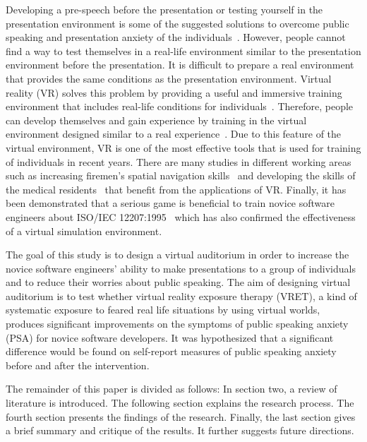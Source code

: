 \documentclass{llncs}
\begin{document}
Developing a pre-speech before the presentation or testing yourself in the presentation environment is some of the suggested solutions to overcome public speaking and presentation anxiety of the individuals~\cite{huff2008public}. However, people cannot find a way to test themselves in a real-life environment similar to the presentation environment before the presentation. It is difficult to prepare a real environment that provides the same conditions as the presentation environment. Virtual reality (VR) solves this problem by providing a useful and immersive training environment that includes real-life conditions for individuals~\cite{sampaio2014application}. Therefore, people can develop themselves and gain experience by training in the virtual environment designed similar to a real experience~\cite{jang2017direct}. Due to this feature of the virtual environment, VR is one of the most effective tools that is used for training of individuals in recent years. There are many studies in different working areas such as increasing firemen's spatial navigation skills~\cite{bliss1997effectiveness} and developing the skills of the medical residents~\cite{seymour2002virtual,grantcharov2004randomized} that benefit from the applications of VR. Finally, it has been demonstrated that a serious game is beneficial to train novice software engineers about ISO/IEC 12207:1995~\cite{aydan2016teaching} which has also confirmed the effectiveness of a virtual simulation environment.

The goal of this study is to design a virtual auditorium in order to increase the novice software engineers' ability to make presentations to a group of individuals and to reduce their worries about public speaking. The aim of designing virtual auditorium is to test whether virtual reality exposure therapy (VRET), a kind of systematic exposure to feared real life situations by using virtual worlds, produces significant improvements on the symptoms of public speaking anxiety (PSA) for novice software developers. It was hypothesized that a significant difference would be found on self-report measures of public speaking anxiety before and after the intervention.

The remainder of this paper is divided as follows: In section two, a review of literature is introduced. The following section explains the research process. The fourth section presents the findings of the research. Finally, the last section gives a brief summary and critique of the results. It further suggests future directions.   
\end{document}
